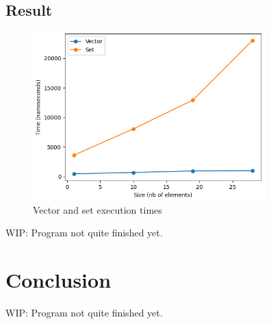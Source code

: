 \documentclass[conference]{IEEEtran} \IEEEoverridecommandlockouts
\begin{document}
\subsection{Result}



\begin{figure}[!h]
	\includegraphics[width=9cm]{Diagram/vector_vs_set.png}
	\caption{Vector and set execution times}
	\label{vector vs set}
\end{figure}

WIP: Program not quite finished yet.

\section{Conclusion}

WIP: Program not quite finished yet.

 
\end{document}

